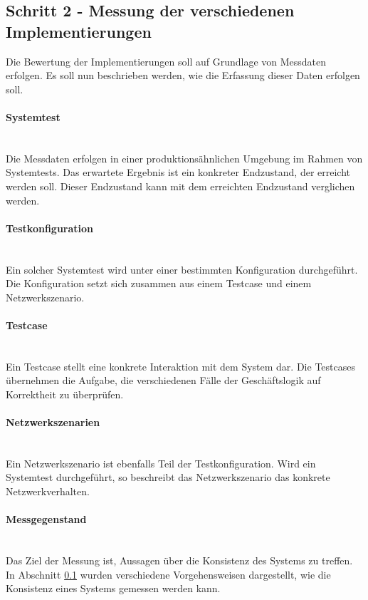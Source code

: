 \subsection{Schritt 2 - Messung der verschiedenen Implementierungen}

Die Bewertung der Implementierungen soll auf Grundlage von Messdaten erfolgen. Es soll nun beschrieben werden, wie die Erfassung dieser Daten erfolgen soll.


\paragraph*{Systemtest} \mbox{}\\
Die Messdaten erfolgen in einer produktionsähnlichen Umgebung im Rahmen von Systemtests. Das erwartete Ergebnis ist ein konkreter Endzustand, der erreicht werden soll. Dieser Endzustand kann mit dem erreichten Endzustand verglichen werden.

\paragraph*{Testkonfiguration} \mbox{}\\
Ein solcher Systemtest wird unter einer bestimmten Konfiguration durchgeführt. Die Konfiguration setzt sich zusammen aus einem Testcase und einem Netzwerkszenario. 

\paragraph*{Testcase} \mbox{}\\
Ein Testcase stellt eine konkrete Interaktion mit dem System dar. Die Testcases übernehmen die Aufgabe, die verschiedenen Fälle der Geschäftslogik auf Korrektheit zu überprüfen.

\paragraph*{Netzwerkszenarien} \mbox{}\\
Ein Netzwerkszenario ist ebenfalls Teil der Testkonfiguration. Wird ein Systemtest durchgeführt, so beschreibt das Netzwerkszenario das konkrete Netzwerkverhalten.

\paragraph*{Messgegenstand} \mbox{}\\
Das Ziel der Messung ist, Aussagen über die Konsistenz des Systems zu treffen. In Abschnitt \ref{} wurden verschiedene Vorgehensweisen dargestellt, wie die Konsistenz eines Systems gemessen werden kann. 

